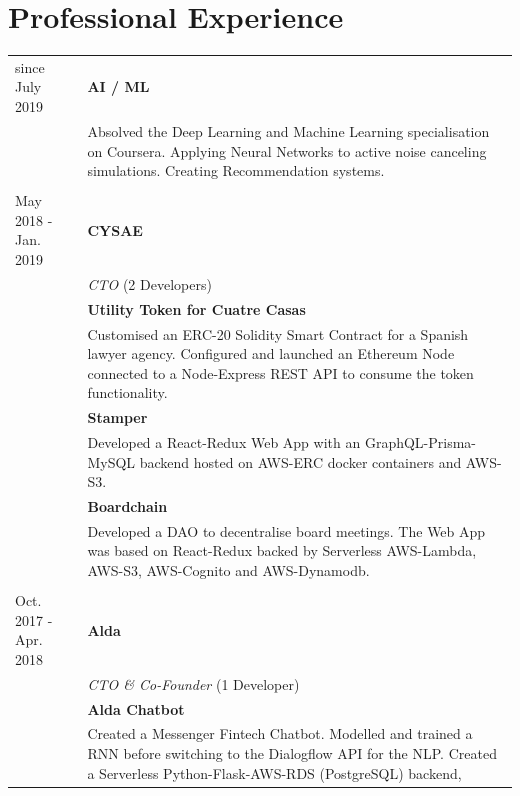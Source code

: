 \documentclass[11pt]{article}
\begin{document}
\section*{Professional Experience}
\begin{tabularx}{\textwidth}{lX}
  since July 2019        & \textbf{AI / ML} \\
                         & Absolved the Deep Learning and Machine Learning
                           specialisation on Coursera. Applying Neural Networks to active noise
                           canceling simulations. Creating Recommendation systems.  \\\\
  May 2018 - Jan. 2019   & \textbf{CYSAE} \\
                         & \textit{CTO} (2 Developers) \\[2mm]
                         & \textbf{Utility Token for Cuatre Casas} \\
                         & Customised an ERC-20 Solidity Smart Contract for
                           a Spanish lawyer agency. Configured and launched an
                           Ethereum Node connected to a Node-Express REST API to consume
                           the token functionality. \\[1.5mm]
                         & \textbf{Stamper} \\
                         & Developed a React-Redux Web App with an
                           GraphQL-Prisma-MySQL backend hosted on AWS-ERC docker
                           containers and AWS-S3. \\[1.5mm]
                         & \textbf{Boardchain} \\
                         & Developed a DAO to decentralise board meetings. The
                           Web App was based on React-Redux backed by
                           Serverless AWS-Lambda, AWS-S3, AWS-Cognito and AWS-Dynamodb. \\\\
  Oct. 2017 - Apr. 2018  & \textbf{Alda} \\
                         & \textit{CTO \& Co-Founder} (1 Developer) \\[2mm]
                         & \textbf{Alda Chatbot} \\
                         & Created a Messenger Fintech Chatbot. Modelled and
                           trained a RNN before switching to the Dialogflow API
                           for the NLP. Created a Serverless Python-Flask-AWS-RDS (PostgreSQL) backend,

\end{tabularx}
\end{document}
